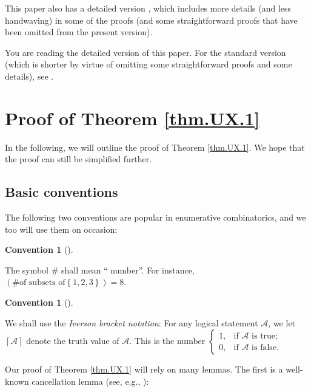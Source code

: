 \documentclass[numbers=enddot,12pt,final,onecolumn,notitlepage]{scrartcl}%
\numberwithin{exer}{section}
\theoremstyle{definition}
\newtheorem{conv}[theo]{Convention}
\newenvironment{convention}[1][]
{\begin{conv}[#1]\begin{leftbar}}
{\end{leftbar}\end{conv}}
\newenvironment{verlong}{}{}
\newenvironment{vershort}{}{}
\begin{document}
\begin{vershort}
This paper also has a detailed version \cite{verlong}, which includes more
details (and less handwaving) in some of the proofs (and some straightforward
proofs that have been omitted from the present version).
\end{vershort}

\begin{verlong}
You are reading the detailed version of this paper. For the standard version
(which is shorter by virtue of omitting some straightforward proofs and some
details), see \cite{vershort}.
\end{verlong}

\section{\label{sec.pf.thm.UX.1}Proof of Theorem \ref{thm.UX.1}}

In the following, we will outline the proof of Theorem \ref{thm.UX.1}. We hope
that the proof can still be simplified further.

\subsection{Basic conventions}

The following two conventions are popular in enumerative combinatorics, and we
too will use them on occasion:

\begin{convention}
\label{conv.number}The symbol \# shall mean \textquotedblleft
number\textquotedblright. For instance, $\left(  \text{\# of subsets of
}\left\{  1,2,3\right\}  \right)  =8$.
\end{convention}

\begin{convention}
\label{conv.iverson}We shall use the \emph{Iverson bracket notation}: For any
logical statement $\mathcal{A}$, we let $\left[  \mathcal{A}\right]  $ denote
the truth value of $\mathcal{A}$. This is the number $%
\begin{cases}
1, & \text{if }\mathcal{A}\text{ is true};\\
0, & \text{if }\mathcal{A}\text{ is false}.
\end{cases}
$
\end{convention}

Our proof of Theorem \ref{thm.UX.1} will rely on many lemmas. The first is a
well-known cancellation lemma (see, e.g., \cite[Proposition 7.8.10]{mps}):
\end{document}
